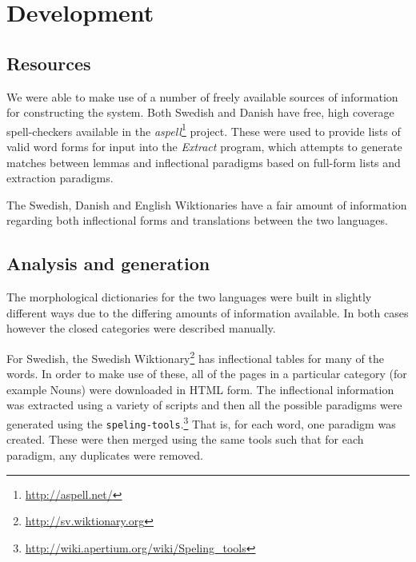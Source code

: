 \documentclass[11pt]{article}
\begin{document}
\section{Development}

\subsection{Resources}


We were able to make use of a number of freely available sources of information for 
constructing the system. Both Swedish and Danish have free, high coverage spell-checkers
available in the \emph{aspell}\footnote{\url{http://aspell.net/}} project. These were used
to provide lists of valid word forms for input into the \emph{Extract} \citep{Forsberg2006} 
program, which attempts to generate matches between lemmas and inflectional paradigms
based on full-form lists and extraction paradigms. 

The Swedish, Danish and English Wiktionaries have a fair amount of information regarding
both inflectional forms and translations between the two languages. 

\subsection{Analysis and generation}


The morphological dictionaries for the two languages were built in slightly 
different ways due to the differing amounts of information available. In both
cases however the closed categories were described manually. 

For Swedish, the Swedish Wiktionary\footnote{\url{http://sv.wiktionary.org}} has
inflectional tables for many of the words. In order to make use of these, all of 
the pages in a particular category (for example Nouns) were downloaded in HTML
form. The inflectional information was extracted using a variety of scripts and 
then all the possible paradigms were generated using the {\tt\small speling-tools}.\footnote{\url{http://wiki.apertium.org/wiki/Speling_tools}}
That is, for each word, one paradigm was created. These were then merged using
the same tools such that for each paradigm, any duplicates were removed. %
\end{document}
